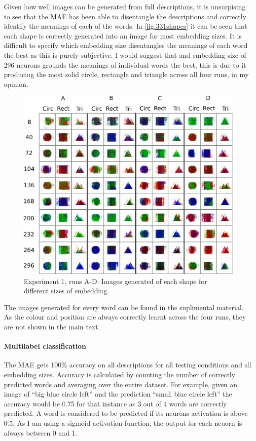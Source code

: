 Given how well images can be generated from full descriptions, it is unsurpising to see that the MAE has been able to disentangle the descriptions and correctly identify the meanings of each of the words. In \autoref{fig:331shapes} it can be seen that each shape is correctly generated into an image for most embedding sizes. It is difficult to specify which embedding size disentangles the meanings of each word the best as this is purely subjective. I would suggest that and embedding size of 296 neurons grounds the meanings of individual words the best, this is due to it producing the most solid circle, rectangle and triangle across all four runs, in my opinion. 

\begin{figure}[ht]
\centering
\includegraphics[width=\textwidth]{Figs/shapes/shapes331.png}
\caption{Experiment 1, runs A-D:  Images generated of each shape for different sizes of embedding.}
\label{fig:331shapes}
\end{figure}

The images generated for every word can be found in the suplimental material. As the colour and position are always  correctly learnt across the four runs, they are not shown in the main text.



\paragraph{Multilabel classification}
The MAE gets 100\% accuracy on all descriptions for all testing conditions and all embedding sizes. Accuracy is calculated by counting the number of correctly predicted words and averaging over the entire dataset. For example, given an image of ``big blue circle left'' and the prediction ``small blue circle left'' the accuracy would be 0.75 for that instance as 3 out of 4 words are correctly predicted. A word is considered to be predicted if its neurons activation is above 0.5. As I am using a sigmoid activation function, the output for each neuorn is always between 0 and 1.


